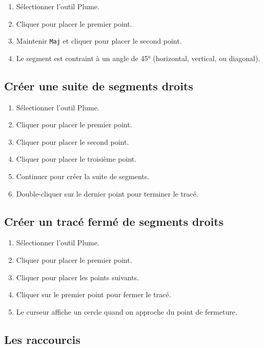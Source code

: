 \begin{enumerate}
    \item Sélectionner l'outil Plume.
    \item Cliquer pour placer le premier point.
    \item Maintenir \texttt{Maj} et cliquer pour placer le second point.
    \item Le segment est contraint à un angle de 45° (horizontal, vertical, ou diagonal).
\end{enumerate}

\subsection{Créer une suite de segments droits}

\begin{enumerate}
    \item Sélectionner l'outil Plume.
    \item Cliquer pour placer le premier point.
    \item Cliquer pour placer le second point.
    \item Cliquer pour placer le troisième point.
    \item Continuer pour créer la suite de segments.
    \item Double-cliquer sur le dernier point pour terminer le tracé.
\end{enumerate}

\subsection{Créer un tracé fermé de segments droits}

\begin{enumerate}
    \item Sélectionner l'outil Plume.
    \item Cliquer pour placer le premier point.
    \item Cliquer pour placer les points suivants.
    \item Cliquer sur le premier point pour fermer le tracé.
    \item Le curseur affiche un cercle quand on approche du point de fermeture.
\end{enumerate}

\subsection{Les raccourcis}

